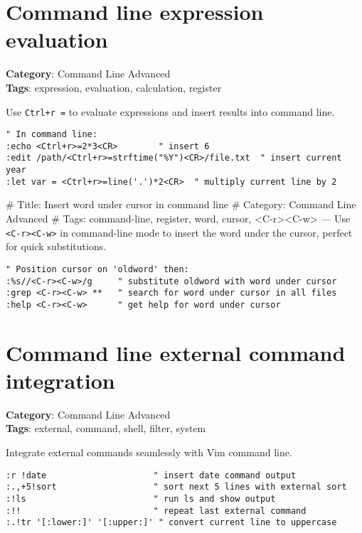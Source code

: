 {{{{\section{Command line expression evaluation}

\textbf{Category}: Command Line Advanced\\ \textbf{Tags}: expression, evaluation, calculation, register
\vspace{0.5cm}

Use {\footnotesize \Verb§Ctrl+r =§} to evaluate expressions and insert results into command line.

\begin{Exa*}{}
\begin{Verbatim}[fontsize=\footnotesize, breaklines, breakanywhere]
" In command line:
:echo <Ctrl+r>=2*3<CR>        " insert 6
:edit /path/<Ctrl+r>=strftime("%Y")<CR>/file.txt  " insert current year
:let var = <Ctrl+r>=line('.')*2<CR>  " multiply current line by 2
\end{Verbatim}
\end{Exa*}

\# Title: Insert word under cursor in command line
\# Category: Command Line Advanced
\# Tags: command-line, register, word, cursor, <C-r><C-w>
---
Use {\footnotesize \Verb§<C-r><C-w>§} in command-line mode to insert the word under the cursor, perfect for quick substitutions.

\begin{Exa*}{}
\begin{Verbatim}[fontsize=\footnotesize, breaklines, breakanywhere]
" Position cursor on 'oldword' then:
:%s//<C-r><C-w>/g     " substitute oldword with word under cursor
:grep <C-r><C-w> **   " search for word under cursor in all files
:help <C-r><C-w>      " get help for word under cursor
\end{Verbatim}
\end{Exa*}

\section{Command line external command integration}

\textbf{Category}: Command Line Advanced\\ \textbf{Tags}: external, command, shell, filter, system
\vspace{0.5cm}

Integrate external commands seamlessly with Vim command line.

\begin{Exa*}{}
\begin{Verbatim}[fontsize=\footnotesize, breaklines, breakanywhere]
:r !date                     " insert date command output
:.,+5!sort                   " sort next 5 lines with external sort
:!ls                         " run ls and show output
:!!                          " repeat last external command
:.!tr '[:lower:]' '[:upper:]' " convert current line to uppercase
\end{Verbatim}
\end{Exa*}

}}}}
